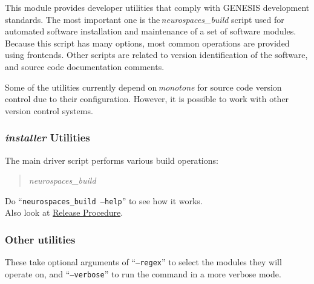 \documentclass[12pt]{article}
\begin{document}
This module provides developer utilities that comply with GENESIS development standards. The most important one is the\,{\it neurospaces\_build} script used for automated software installation and maintenance of a set of software modules. Because this script has many options, most common operations are provided using frontends. Other scripts are related to version identification of the software, and source code documentation comments.

Some of the utilities currently depend on\,{\it monotone} for source code version control due to their configuration. However, it is possible to work with other version control systems. 

\subsubsection*{{\it installer} Utilities}

The main driver script performs various build operations:
\begin{quote}
\item {\it neurospaces\_build}
\end{quote}
Do ``{\tt neurospaces\_build --help}'' to see how it works.\\Also look at \href{../release-procedure/release-procedure.tex}{Release Procedure}. 

\subsubsection*{Other utilities}

These take optional arguments of ``{\tt --regex}'' to select the modules they will operate on, and ``{\tt --verbose}'' to run the command in a more verbose mode. 
\end{document}
